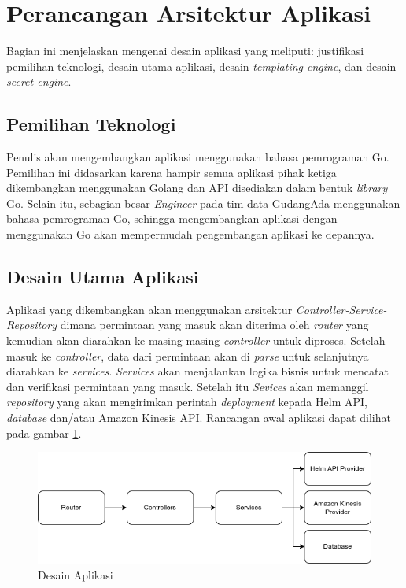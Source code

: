 \section{Perancangan Arsitektur Aplikasi}
\label{sec:perancanganArsitektur}

Bagian ini menjelaskan mengenai desain aplikasi yang meliputi: justifikasi pemilihan teknologi, desain utama aplikasi, desain \textit{templating engine}, dan desain\textit{ secret engine}.

\subsection{Pemilihan Teknologi}
\label{sec:pemilihanTeknologi}
Penulis akan mengembangkan aplikasi menggunakan bahasa pemrograman Go. Pemilihan ini didasarkan karena hampir semua aplikasi pihak ketiga dikembangkan menggunakan Golang dan API disediakan dalam bentuk \textit{library} Go. Selain itu, sebagian besar \textit{Engineer} pada tim data GudangAda menggunakan bahasa pemrograman Go, sehingga mengembangkan aplikasi dengan menggunakan Go akan mempermudah pengembangan aplikasi ke depannya.

\subsection{Desain Utama Aplikasi}
\label{sec:desainUtamaAplikasi}
Aplikasi yang dikembangkan akan menggunakan arsitektur \textit{Controller-Service-Repository} dimana permintaan yang masuk akan diterima oleh \textit{router} yang kemudian akan diarahkan ke masing-masing \textit{controller} untuk diproses. Setelah masuk ke \textit{controller}, data dari permintaan akan di \textit{parse} untuk selanjutnya diarahkan ke \textit{services}. \textit{Services} akan menjalankan logika bisnis untuk mencatat dan verifikasi permintaan yang masuk. Setelah itu \textit{Sevices} akan memanggil \textit{repository} yang akan mengirimkan perintah \textit{deployment} kepada Helm API, \textit{database} dan/atau Amazon Kinesis API. Rancangan awal aplikasi dapat dilihat pada gambar \ref{fig:rancanganAwalAplikasi}.


\begin{figure}
	\centering
	\includegraphics[width=1\textwidth]{pics/rancanganAplikasiAwal.png}
	\caption{Desain Aplikasi}
	\label{fig:rancanganAwalAplikasi}
\end{figure}

